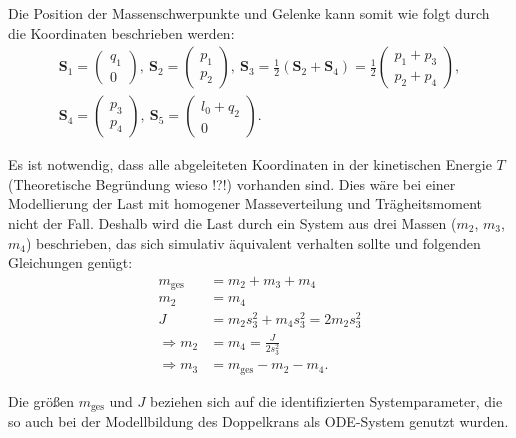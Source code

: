 Die Position der Massenschwerpunkte und Gelenke kann somit wie folgt durch die Koordinaten beschrieben werden:
\begin{align}
	\mathbf{S}_1 =
	\begin{pmatrix}
		q_1 \\
		0
	\end{pmatrix}, 
	\
	\mathbf{S}_2 =
	\begin{pmatrix}
		p_1 \\
		p_2
	\end{pmatrix},
	\
	\mathbf{S}_3 =
	\frac{1}{2}(\mathbf{S}_2 + \mathbf{S}_4) =
	\frac{1}{2}
	\begin{pmatrix}
		p_1 + p_3 \\
		p_2 + p_4
	\end{pmatrix},
	\nonumber \\
	\mathbf{S}_4 =
	\left(\begin{matrix}
		p_3 \\
		p_4
	\end{matrix}\right),
	\
	\mathbf{S}_5 =
	\left(\begin{matrix}
		l_0 + q_2 \\
		0
	\end{matrix}\right).
\end{align}

Es ist notwendig, dass alle abgeleiteten Koordinaten in der kinetischen Energie $T$ (Theoretische Begründung wieso !?!) vorhanden sind. Dies wäre bei einer Modellierung der Last mit homogener Masseverteilung und Trägheitsmoment nicht der Fall. Deshalb wird die Last durch ein System aus drei Massen ($m_2$, $m_3$, $m_4$) beschrieben, das sich simulativ äquivalent verhalten sollte und folgenden Gleichungen genügt:
\begin{align}
	m_{\mathrm{ges}} &= m_2 + m_3 + m_4\\
	m_2 &= m_4\\
	J &= m_2 s_3^2 + m_4 s_3^2 = 2 m_2 s_3^2\\
	\Rightarrow m_2 &= m_4 = \frac{J}{2 s_3^2} \\
	\Rightarrow m_3 &= m_{\mathrm{ges}} - m_2 -m_4.
\end{align}

Die größen $m_{\mathrm{ges}}$ und $J$ beziehen sich auf die identifizierten Systemparameter, die so auch bei der Modellbildung des Doppelkrans als ODE-System genutzt wurden.

